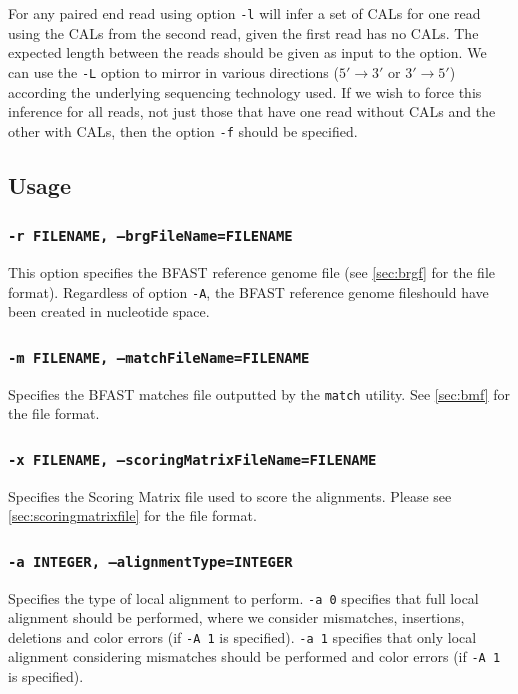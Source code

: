 \documentclass[a4paper,12pt]{book}
\newcommand{\TT}[1]{{\tt #1}} %
\newcommand{\BRGF}{BFAST reference genome file} %
\newcommand{\BMF}{BFAST matches file} %
\begin{document}
For any paired end read using option \TT{-l} will infer a set of CALs for one read using the CALs from the second read, given the first read has no CALs.
The expected length between the reads should be given as input to the option.
We can use the \TT{-L} option to mirror in various directions ($5'\rightarrow 3'$ or $3'\rightarrow 5'$) according the underlying sequencing technology used. 
If we wish to force this inference for all reads, not just those that have one read without CALs and the other with CALs, then the option \TT{-f} should be specified.

\subsection{Usage}
\subsubsection{\TT{-r FILENAME, --brgFileName=FILENAME}}
This option specifies the \BRGF{} (see \autoref{sec:brgf} for the file format).
Regardless of option \TT{-A}, the \BRGF should have been created in nucleotide space.

\subsubsection{\TT{-m FILENAME, --matchFileName=FILENAME}}
Specifies the \BMF{} outputted by the \TT{match} utility.
See \autoref{sec:bmf} for the file format.

\subsubsection{\TT{-x FILENAME, --scoringMatrixFileName=FILENAME}}
Specifies the Scoring Matrix file used to score the alignments.
Please see \autoref{sec:scoringmatrixfile} for the file format.

\subsubsection{\TT{-a INTEGER, --alignmentType=INTEGER}}
Specifies the type of local alignment to perform.
\TT{-a 0} specifies that full local alignment should be performed, where we consider mismatches, insertions, deletions and color errors (if \TT{-A 1} is specified).
\TT{-a 1} specifies that only local alignment considering mismatches should be performed and color errors (if \TT{-A 1} is specified).
%
\end{document}
